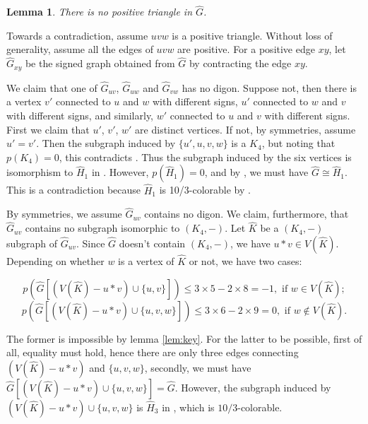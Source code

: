 \documentclass[11pt,a4paper]{article}
\makeatletter
\renewenvironment{proof}[1][\proofname]{\par
	\pushQED{\qed}%
	\normalfont \topsep6\p@\@plus6\p@\relax
	\trivlist
	\item[\hskip\labelsep
	\bfseries
	#1\@addpunct{.}]\ignorespaces
}{%
	\popQED\endtrivlist\@endpefalse
}
\newtheorem{lemma}[theorem]{Lemma}
\theoremstyle{definition}
\makeatother
\begin{document}
\begin{lemma}\label{lem:NoPositiveK3}
	There is no positive triangle in $\widehat{G}$.
\end{lemma}
\begin{proof}
	Towards a contradiction, assume $uvw$ is a positive triangle. Without loss of generality, assume all the edges of $uvw$ are positive. For a positive edge $xy$, let $\widehat{G}_{xy}$ be the signed graph obtained from $\widehat{G}$ by contracting the edge $xy$.
	
	We claim that one of $\widehat{G}_{uv}$, $\widehat{G}_{uw}$ and $\widehat{G}_{vw}$ has no digon. Suppose not, then there is a vertex $v'$ connected to $u$ and $w$ with different signs, $u'$ connected to $w$ and $v$ with different signs, and similarly, $w'$ connected to $u$ and $v$ with different signs. First we claim that $u'$, $v'$, $w'$ are distinct vertices. If not, by symmetries, assume $u'=v'$. Then the subgraph induced by $\{u',u,v,w\}$ is a $K_4$, but noting that $p(K_{4})=0$, this contradicts . Thus the subgraph induced by the six vertices is isomorphism to $\widehat{H}_1$ in . However, $p(\widehat{H}_1)=0$, and by , we must have $\widehat{G}\cong \widehat{H}_1$. This is a contradiction because $\widehat{H}_1$ is 10/3-colorable by .
	
	By symmetries, we assume $\widehat{G}_{uv}$ contains no digon. We claim, furthermore, that $\widehat{G}_{uv}$ contains no subgraph  isomorphic to $(K_4,-)$. Let $\widehat{K}$ be a $(K_4,-)$ subgraph of $\widehat{G}_{uv}$. Since $\widehat{G}$ doesn't contain  $(K_4,-)$, we have $u*v\in V(\widehat{K})$. Depending on whether $w$ is a vertex of $\widehat{K}$ or not, we have two cases:
	
	$$p(\widehat{G}[(V(\widehat{K})-u*v)\cup \{u, v\}])\leq 3\times 5-2\times 8=-1, \text{ if } w\in V(\widehat{K});$$
	$$p(\widehat{G}[(V(\widehat{K})-u*v)\cup \{u, v, w\}])\leq 3\times 6-2\times 9=0, \text{ if } w\notin V(\widehat{K}).$$
	
	
	The former is impossible by lemma \ref{lem:key}. For the latter to be possible, first of all, equality must hold, hence there are only three edges connecting $(V(\widehat{K})-u*v)$ and $\{u, v, w\}$, secondly, we must have $\widehat{G}[(V(\widehat{K})-u*v)\cup \{u, v, w\}]=\widehat{G}$. However, the subgraph induced by $(V(\widehat{K})-u*v)\cup \{u, v, w\}$ is  $\widehat{H}_3$ in , which is $10/3$-colorable.
	

\end{proof}
\end{document}
